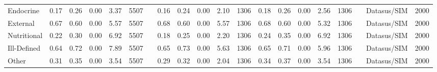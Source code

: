 \begin{sidewaystable}
\begin{table}[H]
\begin{footnotesize}
\begin{center}
{\begin{threeparttable}[b]
\begin{tabular}{rrrrrrrrrrrrrrrrrrrr}
    \multicolumn{1}{l}{Endocrine} & \multicolumn{1}{c}{0.17} & \multicolumn{1}{c}{0.26} & \multicolumn{1}{c}{0.00} & \multicolumn{1}{c}{3.37} & \multicolumn{1}{c}{5507} &       & \multicolumn{1}{c}{0.16} & \multicolumn{1}{c}{0.24} & \multicolumn{1}{c}{0.00} & \multicolumn{1}{c}{2.10} & \multicolumn{1}{c}{1306} & \multicolumn{1}{c}{0.18} & \multicolumn{1}{c}{0.26} & \multicolumn{1}{c}{0.00} & \multicolumn{1}{c}{2.56} & \multicolumn{1}{c}{1306} &       & \multicolumn{1}{c}{Datasus/SIM} & \multicolumn{1}{c}{2000} \\
    \multicolumn{1}{l}{External} & \multicolumn{1}{c}{0.67} & \multicolumn{1}{c}{0.60} & \multicolumn{1}{c}{0.00} & \multicolumn{1}{c}{5.57} & \multicolumn{1}{c}{5507} &       & \multicolumn{1}{c}{0.68} & \multicolumn{1}{c}{0.60} & \multicolumn{1}{c}{0.00} & \multicolumn{1}{c}{5.57} & \multicolumn{1}{c}{1306} & \multicolumn{1}{c}{0.68} & \multicolumn{1}{c}{0.60} & \multicolumn{1}{c}{0.00} & \multicolumn{1}{c}{5.32} & \multicolumn{1}{c}{1306} &       & \multicolumn{1}{c}{Datasus/SIM} & \multicolumn{1}{c}{2000} \\
    \multicolumn{1}{l}{Nutritional} & \multicolumn{1}{c}{0.22} & \multicolumn{1}{c}{0.30} & \multicolumn{1}{c}{0.00} & \multicolumn{1}{c}{6.92} & \multicolumn{1}{c}{5507} &       & \multicolumn{1}{c}{0.18} & \multicolumn{1}{c}{0.25} & \multicolumn{1}{c}{0.00} & \multicolumn{1}{c}{2.20} & \multicolumn{1}{c}{1306} & \multicolumn{1}{c}{0.24} & \multicolumn{1}{c}{0.35} & \multicolumn{1}{c}{0.00} & \multicolumn{1}{c}{6.92} & \multicolumn{1}{c}{1306} &       & \multicolumn{1}{c}{Datasus/SIM} & \multicolumn{1}{c}{2000} \\
    \multicolumn{1}{l}{Ill-Defined} & \multicolumn{1}{c}{0.64} & \multicolumn{1}{c}{0.72} & \multicolumn{1}{c}{0.00} & \multicolumn{1}{c}{7.89} & \multicolumn{1}{c}{5507} &       & \multicolumn{1}{c}{0.65} & \multicolumn{1}{c}{0.73} & \multicolumn{1}{c}{0.00} & \multicolumn{1}{c}{5.63} & \multicolumn{1}{c}{1306} & \multicolumn{1}{c}{0.65} & \multicolumn{1}{c}{0.71} & \multicolumn{1}{c}{0.00} & \multicolumn{1}{c}{5.96} & \multicolumn{1}{c}{1306} &       & \multicolumn{1}{c}{Datasus/SIM} & \multicolumn{1}{c}{2000} \\
    \multicolumn{1}{l}{Other} & \multicolumn{1}{c}{0.31} & \multicolumn{1}{c}{0.35} & \multicolumn{1}{c}{0.00} & \multicolumn{1}{c}{3.54} & \multicolumn{1}{c}{5507} &       & \multicolumn{1}{c}{0.29} & \multicolumn{1}{c}{0.32} & \multicolumn{1}{c}{0.00} & \multicolumn{1}{c}{2.04} & \multicolumn{1}{c}{1306} & \multicolumn{1}{c}{0.34} & \multicolumn{1}{c}{0.37} & \multicolumn{1}{c}{0.00} & \multicolumn{1}{c}{3.54} & \multicolumn{1}{c}{1306} &       & \multicolumn{1}{c}{Datasus/SIM} & \multicolumn{1}{c}{2000} \\

\end{tabular}
\end{threeparttable}}
\end{center}
\end{footnotesize}
\end{table}
\end{sidewaystable}
